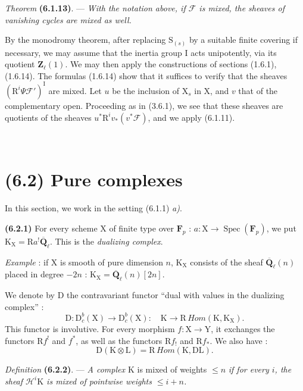 \documentclass[11pt,leqno]{article}
\newcommand{\Page}[1]{\ifvmode\noindent\else\unskip\ \fi{\footnotesize\textcolor{gray}{[p.\,#1]}}\ \ignorespaces}
\begin{document}
\textit{Theorem} \textbf{(6.1.13)}. — \textit{With the notation
above, if \(\mathscr{F}\) is mixed, the sheaves of vanishing
cycles are mixed as well.}

By the monodromy theorem, after replacing
\(\mathrm{S}_{(s)}\) by a suitable finite covering if necessary, we may
assume that the inertia group \(\mathrm{I}\) acts
unipotently, via its quotient \(\mathbf{Z}_\ell(1)\). We may then
apply the constructions of sections (1.6.1), (1.6.14).
The formulas (1.6.14) show that it suffices to verify that the
sheaves \((\mathrm{R}^i\Psi\mathscr{F}')^{\mathrm{I}}\) are
mixed. Let \(u\) be the inclusion of \(\mathrm{X}_s\) in
\(\mathrm{X}\), and \(v\) that of the complementary open.
Proceeding as in (3.6.1), we see that these sheaves are quotients
of the sheaves \(u^*\mathrm{R}^iv_*(v^*\mathscr{F})\), and we apply
(6.1.11).

\Page{247}
\section*{(6.2) Pure complexes}

In this section, we work in the setting (6.1.1) \textit{a)}.

\textbf{(6.2.1)} For every scheme \(\mathrm{X}\) of finite type over
\(\mathbf{F}_p\) : \(a:\mathrm{X}\to\operatorname{Spec}(\mathbf{F}_p)\),
we put \(\mathrm{K}_{\mathrm{X}}=\mathrm{R}a^!\overline{\mathbf{Q}}_\ell\).
This is the \textit{dualizing complex}.

\textit{Example} : if \(\mathrm{X}\) is smooth of pure dimension
\(n\), \(\mathrm{K}_{\mathrm{X}}\) consists of the sheaf
\(\overline{\mathbf{Q}}_\ell(n)\) placed in degree \(-2n\) :
\(\mathrm{K}_{\mathrm{X}}=\overline{\mathbf{Q}}_\ell(n)[2n]\).

We denote by \(\mathrm{D}\) the contravariant functor “dual with values
in the dualizing complex” :
\[
\mathrm{D}:\mathrm{D}_c^b(\mathrm{X})\to\mathrm{D}_c^b(\mathrm{X}):
\quad \mathrm{K}\to\mathrm{R}\,\mathit{Hom}(\mathrm{K},\mathrm{K}_{\mathrm{X}}).
\]
This functor is involutive. For every morphism
\(f:\mathrm{X}\to\mathrm{Y}\), it exchanges the functors
\(\mathrm{R}f^!\) and \(f^*\), as well as the functors
\(\mathrm{R}f_!\) and \(\mathrm{R}f_*\). We also have :
\[
\mathrm{D}(\mathrm{K}\otimes\mathrm{L})
=\mathrm{R}\,\mathit{Hom}(\mathrm{K},\mathrm{D}\mathrm{L}).
\]

\textit{Definition} \textbf{(6.2.2)}. — \textit{A complex
\(\mathrm{K}\)} is mixed of weights \(\leq n\) \textit{if for every
\(i\), the sheaf \(\mathscr{H}^i\mathrm{K}\) is mixed of pointwise
weights \(\leq i+n\).}
\end{document}
